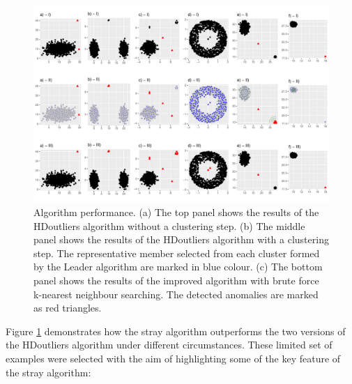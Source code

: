 \documentclass[11pt,a4paper,]{article}
\theoremstyle{definition}
\theoremstyle{definition}
\theoremstyle{definition}
\theoremstyle{remark}
\begin{document}
\begin{figure}[h]

{\centering \includegraphics[width=1\linewidth]{figure/compareAlgorithm-1} 

}

\caption{Algorithm performance. (a) The top panel shows the results of the HDoutliers algorithm without a clustering step. (b) The middle panel shows the results of the HDoutliers algorithm with a clustering step. The representative member selected from each cluster formed by the Leader algorithm are marked in blue colour. (c) The bottom panel shows the results of the improved algorithm with brute force k-nearest neighbour searching. The detected anomalies are marked as red triangles.}\label{fig:compareAlgorithm}
\end{figure}

Figure \ref{fig:compareAlgorithm} demonstrates how the stray algorithm outperforms the two versions of the HDoutliers algorithm under different circumstances. These limited set of examples were selected with the aim of highlighting some of the key feature of the stray algorithm:
\end{document}
